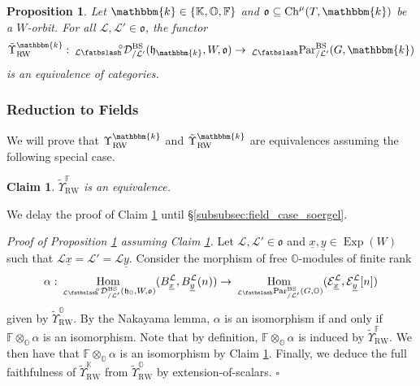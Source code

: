 \documentclass{amsart}
\newcommand{\F}{\mathbb{F}}
\renewcommand{\O}{\mathbb{O}}
\newcommand{\K}{\mathbb{K}}
\renewcommand{\k}{\mathbbm{k}}
\newcommand{\scrE}{\mathcal{E}}
\newcommand{\scrL}{\mathcal{L}}
\DeclareMathOperator{\Hom}{Hom}
\DeclareMathOperator{\Ch}{Ch}
\newcommand{\fr}[1]{\mathfrak{#1}}
\DeclareMathOperator{\RW}{RW}
\DeclareMathOperator{\BS}{BS}
\newcommand{\PME}[2]{\:_{#1 \smallleftdash} \textnormal{Par}_{/ #2} }
\newcommand{\grEWmonME}[2]{\:_{#1 \smallleftdash} \!\!{}^{\circ} \mathcal{D}_{/ #2} }
\DeclareMathOperator{\Exp}{Exp}
\newcommand{\ux}{\underline{x}}
\newcommand{\uy}{\underline{y}}
\newcommand{\bfslash}{\mathbin{\fatbslash}}
\newcommand*\smallleftdash{\bfslash}
\newtheorem{proposition}[subsubsection]{Proposition}
\newtheorem{claim}[subsubsection]{Claim}
\theoremstyle{definition}
\newenvironment{midsecproof}[1]{\vspace{\topsep} \noindent \textit{Proof of #1.}}{\hfill $\square$}
\numberwithin{equation}{subsection}
\begin{document}
\begin{proposition}\label{prop:L_mon_RW_thm}
    Let $\k \in \{\K, \O, \F\}$ and $\fr{o} \subseteq \Ch^{\mu} (T, \k)$ be a $W$-orbit. For all $\scrL, \scrL' \in \fr{o}$, the functor
    \[\tilde{\Upsilon}_{\RW}^{\k} : \grEWmonME{\scrL}{\scrL'}^{\BS} (\fr{h}_{\k}, W, \fr{o}) \to \PME{\scrL}{\scrL'}^{\BS} (G, \k)\]
    is an equivalence of categories.
\end{proposition}

\subsubsection{Reduction to Fields}

We will prove that $\Upsilon_{\RW}^{\k}$ and $\tilde{\Upsilon}_{\RW}^{\k}$ are equivalences assuming the following special case.

\begin{claim}\label{claim:field_case}
     $\tilde{\Upsilon}_{\RW}^{\F}$ is an equivalence.
\end{claim}

We delay the proof of Claim \ref{claim:field_case} until \S\ref{subsubsec:field_case_soergel}.

\begin{midsecproof}{Proposition \ref{prop:L_mon_RW_thm} assuming Claim \ref{claim:field_case}}
  Let $\scrL, \scrL' \in \fr{o}$ and $\ux, \uy \in \Exp (W)$ such that $\scrL \ux = \scrL' = \scrL \uy$.
  Consider the morphism of free $\O$-modules of finite rank
  \[\alpha : \Hom_{\grEWmonME{\scrL}{\scrL'}^{\BS} (\fr{h}_{\O}, W, \fr{o})} (B_{\ux}^{\scrL}, B_{\uy}^{\scrL} (n)) \to  \Hom_{\PME{\scrL}{\scrL'}^{\BS} (G, \O)} (\scrE_{\ux}^{\scrL}, \scrE_{\uy}^{\scrL} [n])\]
  given by $\tilde{\Upsilon}_{\RW}^{\O}$.
  By the Nakayama lemma, $\alpha$ is an isomorphism if and only if $\F \otimes_{\O} \alpha$ is an isomorphism.
  Note that by definition, $\F \otimes_{\O} \alpha$ is induced by $\tilde{\Upsilon}_{\RW}^{\F}$. We then have that $\F \otimes_{\O} \alpha$ is an isomorphism by Claim \ref{claim:field_case}.
  Finally, we deduce the full faithfulness of $\tilde{\Upsilon}_{\RW}^{\K}$ from $\tilde{\Upsilon}_{\RW}^{\O}$ by extension-of-scalars.
\end{midsecproof}
\end{document}
